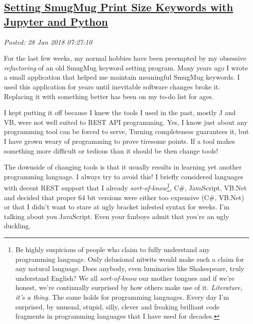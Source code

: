 %

\subsection*{\href{https://analyzethedatanotthedrivel.org/2018/01/28/setting-smugmug-print-size-keywords-with-jupyter-and-python/}{Setting SmugMug Print Size Keywords with Jupyter and Python}}


\noindent\emph{Posted: 28 Jan 2018 07:27:10}
\vspace{6pt}

For the last few weeks, my normal hobbies have been preempted by my
obsessive \emph{refactoring} of an old SmugMug keyword setting program.
Many years ago I wrote a small application that helped me maintain
meaningful SmugMug keywords. I used this application for years until
inevitable software changes broke it. Replacing it with something better
has been on my to-do list for ages.

I kept putting it off because I knew the tools I used in the past,
mostly J and VB, were not well suited to REST API programming. Yes, I
know just about any programming tool can be forced to serve, Turning
completeness guarantees it, but I have grown weary of programming to
prove tiresome points. If a tool makes something more difficult or
tedious than it should be then change tools!

The downside of changing tools is that it usually results in learning
yet another programming language. I always try to avoid this! I briefly
considered languages with decent REST support that I already
\emph{sort-of-know}\footnote{Be highly suspicious of people who claim to fully understand any
  programming language. Only delusional nitwits would make such a claim
  for any natural language. Does anybody, even luminaries like
  Shakespeare, truly understand English? We all \emph{sort-of-know} our
  mother tongues and if we're honest, we're continually surprised by how
  others make use of it. \emph{Literature, it's a thing.} The same holds
  for programming languages. Every day I'm surprised, by unusual,
  stupid, silly, clever and freaking brilliant code fragments in
  programming languages that I have used for
  decades.
}, C\#,
JavaScript, VB.Net and decided that proper 64 bit versions were either
too expensive (C\#, VB.Net) or that I didn't want to stare at ugly
bracket infested syntax for weeks. I'm talking about you JavaScript.
Even your fanboys admit that you're an ugly duckling.

